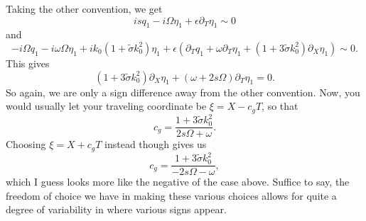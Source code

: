 \documentclass[a4paper,11pt]{article}
\newcommand{\p}{\partial}
\begin{document}
Taking the other convention, we get 
\[
is q_{1} - i\Omega \eta_{1} + \epsilon \p_{T}\eta_{1} \sim 0
\]
and
\[
-i\Omega q_{1} - i\omega \Omega \eta_{1} + ik_{0}(1+\tilde{\sigma}k_{0}^{2})\eta_{1} + \epsilon\left(\p_{T}q_{1} + \omega\p_{T}\eta_{1} + (1+3\tilde{\sigma}k_{0}^{2})\p_{X}\eta_{1} \right) \sim 0.
\]
This gives
\[
(1+3\tilde{\sigma}k_{0}^{2})\p_{X}\eta_{1} + (\omega+2s\Omega)\p_{T}\eta_{1} = 0.
\]
So again, we are only a sign difference away from the other convention.  Now, you would usually let your traveling coordinate be $\xi = X - c_{g}T$, so that 
\[
c_{g} = \frac{1+3\tilde{\sigma}k_{0}^{2}}{2s\Omega + \omega}.
\]
Choosing $\xi=X+c_{g}T$ instead though gives us
\[
c_{g} = \frac{1+3\tilde{\sigma}k_{0}^{2}}{-2s\Omega - \omega},
\]
 which I guess looks more like the negative of the case above.  Suffice to say, the freedom of choice we have in making these various choices allows for quite a degree of variability in where various signs appear.  
\end{document}
